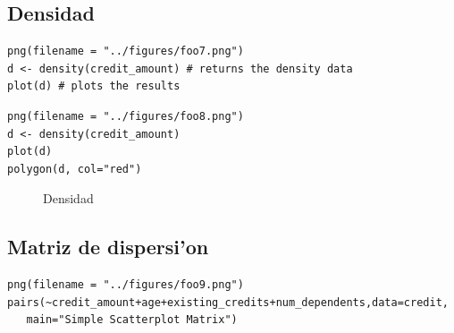 \subsection{Densidad}

\begin{verbatim}
png(filename = "../figures/foo7.png")
d <- density(credit_amount) # returns the density data
plot(d) # plots the results 
\end{verbatim}

\begin{verbatim}
png(filename = "../figures/foo8.png")
d <- density(credit_amount)
plot(d)
polygon(d, col="red") 
\end{verbatim}

\begin{figure}[h]
 \begin{center}
 \hspace{0.1cm}
 \caption{Densidad}
 \label{fig:densidad}
 \end{center}
\end{figure}

\subsection{Matriz de dispersi'on}

\begin{verbatim}
png(filename = "../figures/foo9.png")
pairs(~credit_amount+age+existing_credits+num_dependents,data=credit,
   main="Simple Scatterplot Matrix")

\end{verbatim}

